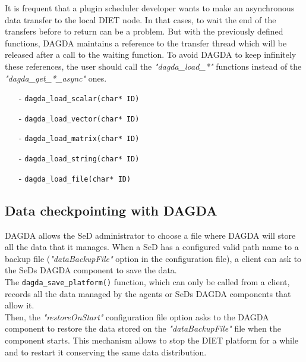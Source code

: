 It is frequent that a plugin scheduler developer wants to make an asynchronous
data transfer to the local DIET node. In that cases, to wait the end of the
transfers before to return can be a problem. But with the previously defined
functions, DAGDA maintains a reference to the transfer thread which will be
released after a call to the waiting function. To avoid DAGDA to keep
infinitely these references, the user should call the \textit{"dagda\_load\_*"}
functions instead of the \textit{"dagda\_get\_*\_async"} ones.

\begin{itemize}
\item[-] \verb#dagda_load_scalar(char* ID)#
\item[-] \verb#dagda_load_vector(char* ID)#
\item[-] \verb#dagda_load_matrix(char* ID)#
\item[-] \verb#dagda_load_string(char* ID)#
\item[-] \verb#dagda_load_file(char* ID)#
\end{itemize}

\subsection{Data checkpointing with DAGDA}
DAGDA allows the SeD administrator to choose a file where DAGDA will store
all the data that it manages. When a SeD has a configured valid path name to a
backup file (\textit{"dataBackupFile"} option in the configuration file),
a client can ask to the SeDs DAGDA component to save the data.\\

The \verb#dagda_save_platform()# function, which can only be
called from a client, records all the data managed by the agents or SeDs DAGDA
components that allow it.\\
Then, the \textit{"restoreOnStart"} configuration file option asks to the
DAGDA component to restore the data stored on the \textit{"dataBackupFile"}
file when the component starts. This mechanism allows to stop the DIET
platform for a while and to restart it conserving the same data distribution.

